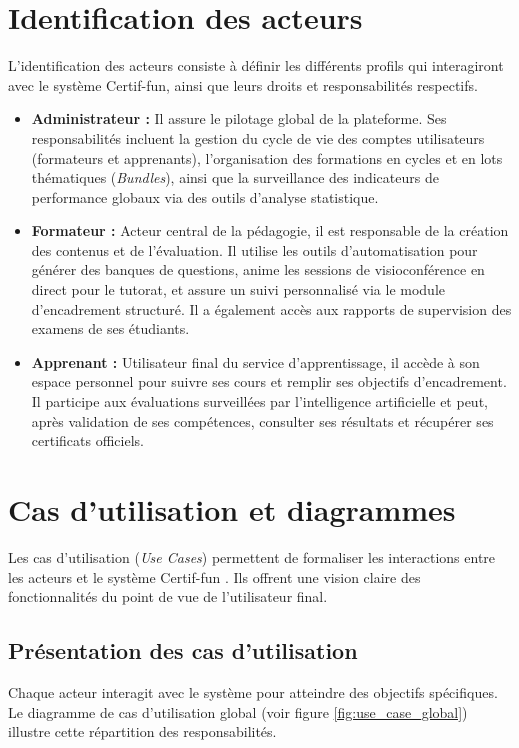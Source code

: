 \section{Identification des acteurs}
L'identification des acteurs consiste à définir les différents profils qui interagiront avec le système Certif-fun, ainsi que leurs droits et responsabilités respectifs.

\begin{itemize}
    \item \textbf{Administrateur :} Il assure le pilotage global de la plateforme. Ses responsabilités incluent la gestion du cycle de vie des comptes utilisateurs (formateurs et apprenants), l'organisation des formations en cycles et en lots thématiques (\textit{Bundles}), ainsi que la surveillance des indicateurs de performance globaux via des outils d'analyse statistique.
    
    \item \textbf{Formateur :} Acteur central de la pédagogie, il est responsable de la création des contenus et de l'évaluation. Il utilise les outils d'automatisation pour générer des banques de questions, anime les sessions de visioconférence en direct pour le tutorat, et assure un suivi personnalisé via le module d'encadrement structuré. Il a également accès aux rapports de supervision des examens de ses étudiants.
    
    \item \textbf{Apprenant :} Utilisateur final du service d'apprentissage, il accède à son espace personnel pour suivre ses cours et remplir ses objectifs d'encadrement. Il participe aux évaluations surveillées par l'intelligence artificielle et peut, après validation de ses compétences, consulter ses résultats et récupérer ses certificats officiels.
\end{itemize}

\section{Cas d’utilisation et diagrammes}
Les cas d'utilisation (\textit{Use Cases}) permettent de formaliser les interactions entre les acteurs et le système Certif-fun \cite{benabderrezak2025cas}. Ils offrent une vision claire des fonctionnalités du point de vue de l'utilisateur final.

\subsection{Présentation des cas d'utilisation}
Chaque acteur interagit avec le système pour atteindre des objectifs spécifiques. Le diagramme de cas d'utilisation global (voir figure \ref{fig:use_case_global}) illustre cette répartition des responsabilités.


